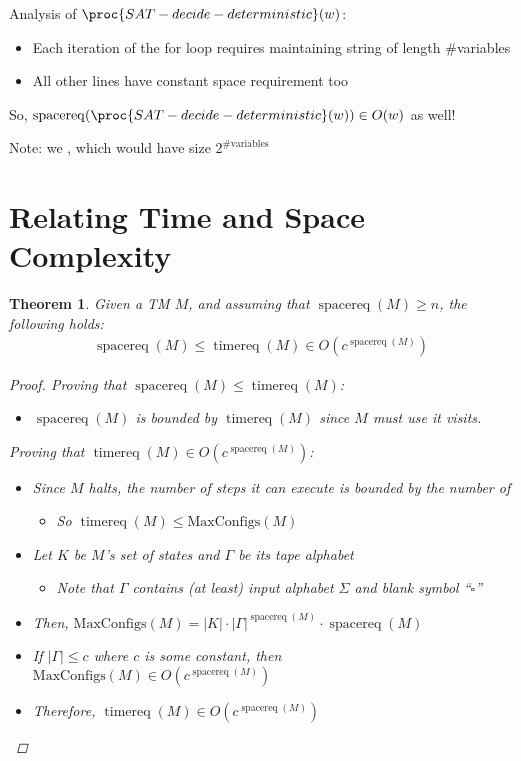 \documentclass[a4paper]{report}
\newtheorem{theo}{Theorem}
\newcommand{\bookref}[3]{\marginpar{\faBook{}~#1\\Chapter #2\\Section #3}}
\theoremstyle{definition}
\DeclareMathOperator*{\treq}{timereq}
\DeclareMathOperator*{\sreq}{spacereq}
\begin{document}
Analysis of $\proc{SAT-decide-deterministic}(w)$:
\begin{itemize}
\item Each iteration of the for loop requires maintaining  string of length \#variables
\item All other lines have constant space requirement too
\end{itemize}

So, $\sreq(\proc{SAT-decide-deterministic}(w)) \in O(w)$ as well!

Note: we , which would have size $2^{\text{\#variables}}$

\section{Relating Time and Space Complexity}
\bookref{ER}{29}{29.1.2}
\begin{theo}
Given a TM $M$,
and assuming that $\sreq(M) \geq n$, the following holds:
\begin{align*}
\sreq(M) \leq \treq(M) \in O(c^{\sreq(M)})
\end{align*}
\begin{proof}
Proving that $\sreq(M) \leq \treq(M)$:
\begin{itemize}
\item $\sreq(M)$ is bounded by $\treq(M)$ since $M$ must use  it visits.
\end{itemize}

Proving that $\treq(M) \in O(c^{\sreq(M)})$:
\begin{itemize}
\item Since $M$ halts, the number of steps it can execute is bounded by the number of 
\begin{itemize}
\item So $\treq(M) \leq \mathrm{MaxConfigs}(M)$
\end{itemize}
\item Let $K$ be $M$'s set of states and $\Gamma$ be its tape alphabet
\begin{itemize}
\item Note that $\Gamma$ contains (at least) input alphabet $\Sigma$ and blank symbol ``$\square$''
\end{itemize}
\item Then, $\mathrm{MaxConfigs}(M) = |K| \cdot |\Gamma|^{\sreq(M)} \cdot \sreq(M)$
\item If $|\Gamma| \leq c$ where $c$ is some constant, then $\mathrm{MaxConfigs}(M) \in O(c^{\sreq(M)})$
\item Therefore, $\treq(M) \in O(c^{\sreq(M)})$
\end{itemize}
\end{proof}
\end{theo}
\end{document}
